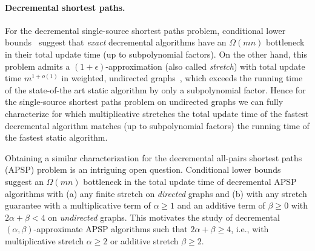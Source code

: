 \paragraph{Decremental shortest paths.} For the decremental single-source shortest paths problem, conditional lower bounds~\cite{RodittyZ11,HenzingerKNS15} suggest that \emph{exact} decremental algorithms have an $\Omega(mn)$ bottleneck in their total update time (up to subpolynomial factors).
On the other hand, this problem admits a $ (1 + \epsilon) $-approximation (also called \emph{stretch}) with total update time $ m^{1 + o(1)} $ in weighted, undirected graphs~\cite{BR11,henzinger2014decremental,BernsteinC16,Bernstein17,BernsteinGS21}, which exceeds the running time of the state-of-the art static algorithm by only a subpolynomial factor. Hence for the single-source shortest paths problem on undirected graphs we can fully characterize for which multiplicative stretches the total update time of the fastest decremental algorithm matches (up to subpolynomial factors) the running time of the fastest static algorithm.

Obtaining a similar characterization for the decremental all-pairs shortest paths (APSP) problem is an intriguing open question.
Conditional lower bounds~\cite{DHZ00,HenzingerKNS15} suggest an $\Omega(mn)$ bottleneck in the total update time of decremental APSP algorithms with (a) any finite stretch on \textit{directed} graphs and (b)  with any stretch guarantee with a multiplicative term of $ \alpha \geq 1 $ and an additive term of $ \beta \geq 0 $ with $ 2 \alpha + \beta < 4 $ on \textit{undirected} graphs. This motivates the study of decremental $ (\alpha, \beta) $-approximate APSP algorithms such that $ 2 \alpha + \beta \geq 4 $, i.e., with multiplicative stretch $ \alpha \geq 2 $ or additive stretch $ \beta \geq 2 $.


